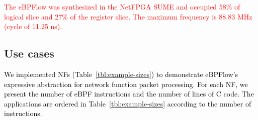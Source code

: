 
\textcolor{red}{The eBPFlow was synthesized in the NetFPGA SUME and occupied 58\% of logical slice and 27\% of the register slice. The maximum frequency is 88.83 MHz (cycle of 11.25 ns).}


\subsection{Use cases}
\textcolor{black}{We implemented NFs (Table~\ref{tbl:example-sizes}) to demonstrate eBPFlow's expressive abstraction for network function packet processing. For each NF, we present the number of eBPF instructions and the number of lines of C code. The applications are ordered in Table~\ref{tbl:example-sizes} according to the number of instructions.}

\begin{table}[h]
\centering
\caption{eBPF programs used during experiments.}
\label{tbl:example-sizes}
\end{table}

